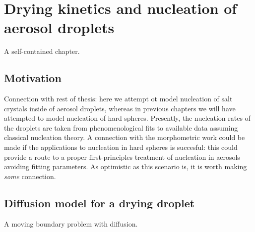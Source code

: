 \documentclass[12pt,twoside]{report}
\begin{document}
\chapter{Drying kinetics and nucleation of aerosol droplets}
A self-contained chapter.

\section{Motivation}
Connection with rest of thesis: here we attempt ot model nucleation of salt crystals inside of aerosol droplets, whereas in previous chapters we will have attempted to model nucleation of hard spheres.
Presently, the nucleation rates of the droplets are taken from phenomenological fits to available data assuming classical nucleation theory.
A connection with the morphometric work could be made if the applications to nucleation in hard spheres is succesful: this could provide a route to a proper first-principles treatment of nucleation in aerosols avoiding fitting parameters.
As optimistic as this scenario is, it is worth making \emph{some} connection.

\section{Diffusion model for a drying droplet}
A moving boundary problem with diffusion.
\end{document}
